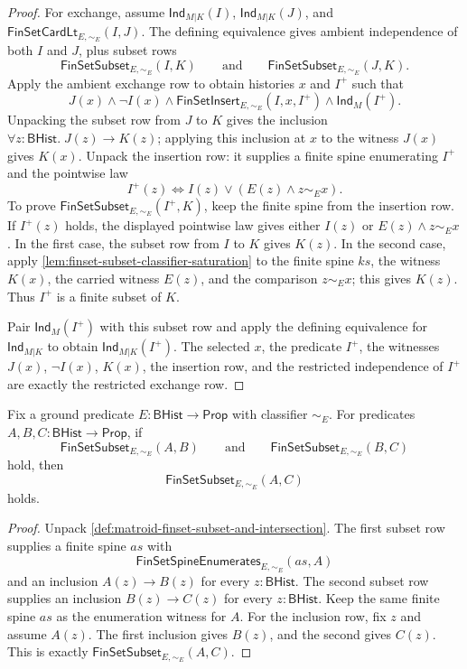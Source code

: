 \begin{proof}
For exchange, assume $\mathsf{Ind}_{M|K}(I)$, $\mathsf{Ind}_{M|K}(J)$, and $\mathsf{FinSetCardLt}_{E,\sim_E}(I,J)$. The defining equivalence gives ambient independence of both $I$ and $J$, plus subset rows
$$
\mathsf{FinSetSubset}_{E,\sim_E}(I,K)
\qquad\text{and}\qquad
\mathsf{FinSetSubset}_{E,\sim_E}(J,K).
$$
Apply the ambient exchange row to obtain histories $x$ and $I^+$ such that
$$
J(x)\land\neg I(x)\land
\mathsf{FinSetInsert}_{E,\sim_E}(I,x,I^+)\land
\mathsf{Ind}_M(I^+).
$$
Unpacking the subset row from $J$ to $K$ gives the inclusion $\forall z:\mathsf{BHist}.\;J(z)\to K(z)$; applying this inclusion at $x$ to the witness $J(x)$ gives $K(x)$. Unpack the insertion row: it supplies a finite spine enumerating $I^+$ and the pointwise law
$$
I^+(z)\Longleftrightarrow I(z)\vee(E(z)\land z\sim_E x).
$$
To prove $\mathsf{FinSetSubset}_{E,\sim_E}(I^+,K)$, keep the finite spine from the insertion row. If $I^+(z)$ holds, the displayed pointwise law gives either $I(z)$ or $E(z)\land z\sim_E x$. In the first case, the subset row from $I$ to $K$ gives $K(z)$. In the second case, apply \autoref{lem:finset-subset-classifier-saturation} to the finite spine $ks$, the witness $K(x)$, the carried witness $E(z)$, and the comparison $z\sim_E x$; this gives $K(z)$. Thus $I^+$ is a finite subset of $K$.

Pair $\mathsf{Ind}_M(I^+)$ with this subset row and apply the defining equivalence for $\mathsf{Ind}_{M|K}$ to obtain $\mathsf{Ind}_{M|K}(I^+)$. The selected $x$, the predicate $I^+$, the witnesses $J(x)$, $\neg I(x)$, $K(x)$, the insertion row, and the restricted independence of $I^+$ are exactly the restricted exchange row.
\end{proof}

\begin{lemma}
\label{lem:matroid-finset-subset-row-composition}
Fix a ground predicate $E:\mathsf{BHist}\to\mathsf{Prop}$ with classifier $\sim_E$. For predicates $A,B,C:\mathsf{BHist}\to\mathsf{Prop}$, if
$$
\mathsf{FinSetSubset}_{E,\sim_E}(A,B)
\qquad\text{and}\qquad
\mathsf{FinSetSubset}_{E,\sim_E}(B,C)
$$
hold, then
$$
\mathsf{FinSetSubset}_{E,\sim_E}(A,C)
$$
holds.
\end{lemma}
\begin{proof}
Unpack \autoref{def:matroid-finset-subset-and-intersection}. The first subset row supplies a finite spine $as$ with
$$
\mathsf{FinSetSpineEnumerates}_{E,\sim_E}(as,A)
$$
and an inclusion $A(z)\to B(z)$ for every $z:\mathsf{BHist}$. The second subset row supplies an inclusion $B(z)\to C(z)$ for every $z:\mathsf{BHist}$. Keep the same finite spine $as$ as the enumeration witness for $A$. For the inclusion row, fix $z$ and assume $A(z)$. The first inclusion gives $B(z)$, and the second gives $C(z)$. This is exactly $\mathsf{FinSetSubset}_{E,\sim_E}(A,C)$.
\end{proof}

